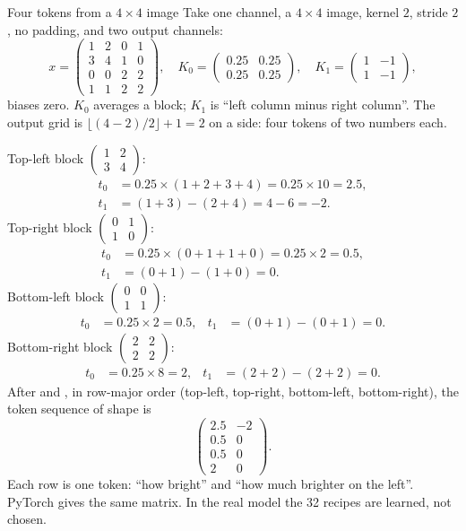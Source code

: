 \begin{worked}[label={we:patchembed:tiny}]{Four tokens from a $4\times4$ image}
Take one channel, a $4\times4$ image, kernel $2$, stride $2$, no padding, and two output channels:
\[
x = \begin{pmatrix}1&2&0&1\\3&4&1&0\\0&0&2&2\\1&1&2&2\end{pmatrix},\quad
K_0 = \begin{pmatrix}0.25&0.25\\0.25&0.25\end{pmatrix},\quad
K_1 = \begin{pmatrix}1&-1\\1&-1\end{pmatrix},
\]
biases zero. $K_0$ averages a block; $K_1$ is ``left column minus right column''. The output grid is
$\lfloor(4-2)/2\rfloor + 1 = 2$ on a side: four tokens of two numbers each.

Top-left block $\begin{pmatrix}1&2\\3&4\end{pmatrix}$:
\begin{align*}
t_0 &= 0.25\times(1+2+3+4) = 0.25\times10 = 2.5,\\
t_1 &= (1 + 3) - (2 + 4) = 4 - 6 = -2.
\end{align*}
Top-right block $\begin{pmatrix}0&1\\1&0\end{pmatrix}$:
\begin{align*}
t_0 &= 0.25\times(0+1+1+0) = 0.25\times2 = 0.5,\\
t_1 &= (0 + 1) - (1 + 0) = 0.
\end{align*}
Bottom-left block $\begin{pmatrix}0&0\\1&1\end{pmatrix}$:
\begin{align*}
t_0 &= 0.25\times2 = 0.5, & t_1 &= (0+1) - (0+1) = 0.
\end{align*}
Bottom-right block $\begin{pmatrix}2&2\\2&2\end{pmatrix}$:
\begin{align*}
t_0 &= 0.25\times8 = 2, & t_1 &= (2+2) - (2+2) = 0.
\end{align*}
After  and , in row-major order (top-left, top-right,
bottom-left, bottom-right), the token sequence of shape  is
\[
\begin{pmatrix}2.5 & -2\\ 0.5 & 0\\ 0.5 & 0\\ 2 & 0\end{pmatrix}.
\]
Each row is one token: ``how bright'' and ``how much brighter on the left''. PyTorch gives the same
matrix\tagC. In the real model the 32 recipes are learned, not chosen.
\end{worked}

